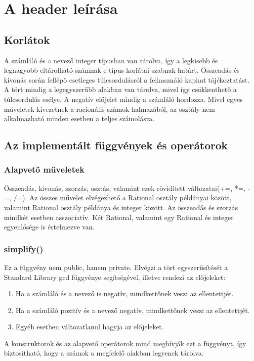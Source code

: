 \documentclass[a4paper, 12pt]{article}
\begin{document}
\section{A header leírása}

\subsection*{Korlátok}
A számláló és a nevező integer típusban van tárolva, így a legkisebb és legnagyobb eltárolható számnak e típus korlátai szabnak határt. 
\newline
Összeadás és kivonás során fellépő esetleges túlcsordulásról a felhasználó kaphat tájékoztatást.
\newline
A tört mindig a legegyszerűbb alakban van tárolva, mivel így csökkenthető a túlcsordulás esélye.
\newline
A negatív előjelet mindig a számláló hordozza.
\newline
Mivel egyes műveletek kivezetnek a racionális számok halmazából, az osztály nem alkalmazható minden esetben a teljes számolásra. 

\subsection*{Az implementált függvények és operátorok}
\subsubsection*{Alapvető műveletek}
Összeadás, kivonás, szorzás, osztás, valamint ezek rövidített változatai(+=, *=, -=, /=). Az összes művelet elvégezhető a Rational osztály példányai között, valamint Rational osztály példánya és integer között. Az összeadás és szorzás mindkét esetben asszociatív.
Két Rational, valamint egy Rational és integer egyenlősége is értelmezve van.
\subsubsection*{simplify()}
Ez a függvény nem public, hanem private. Elvégzi a tört egyszerűsítését a Standard Library gcd függvénye segítségével, illetve rendezi az előjeleket:
\begin{enumerate}
  \item Ha a számláló és a nevező is negatív, mindkettőnek veszi az ellentettjét.
  \item  Ha a számláló pozitív és a nevező negatív, mindkettőnek veszi az ellentettjét.
  \item  Egyéb esetben változatlanul hagyja az előjeleket.
\end{enumerate}
\noindent
 A konstruktorok és az alapvető operátorok mind meghívják ezt a függvényt, így biztosítható, hogy a számok a megfelelő alakban legyenek tárolva.
\end{document}
